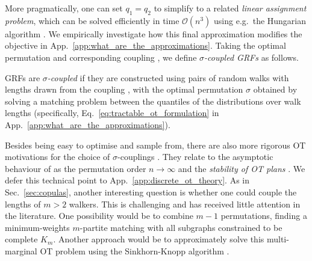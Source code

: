 More pragmatically, one can set $q_1 = q_2$ to simplify to a related \emph{linear assignment problem}, which can be solved efficiently in time $\mathcal{O}(n^3)$ using e.g.~the Hungarian algorithm \citep{kuhn1955hungarian}.
We empirically investigate how this final approximation modifies the objective in App.~\ref{app:what_are_the_approximations}.
Taking the optimal permutation and corresponding coupling \smash{$\mu^{(\sigma)}$}, we define \emph{$\sigma$-coupled GRFs} as follows.


\color{black}

\begin{tcolorbox}[colback=gray!10!white,colframe=gray!50!black,arc=0mm,boxrule=0.5pt]
\begin{definition} \label{def:coupled_grfs_def}
GRFs are \emph{$\sigma$-coupled} if they are constructed using pairs of random walks with lengths drawn from the coupling \smash{$\mu^{(\sigma)}$}, with the optimal permutation $\sigma$ obtained by solving a matching problem between the quantiles of the distributions over walk lengths (specifically, Eq.~\ref{eq:tractable_ot_formulation} in App.~\ref{app:what_are_the_approximations}).
\end{definition}
\end{tcolorbox}

Besides being easy to optimise and sample from, there are also more rigorous OT motivations for the choice of $\sigma$-couplings \smash{$\mu^{(\sigma)}$}.
They relate to the asymptotic behaviour of \smash{$\mu^{(\sigma)}$} as the permutation order $n \to \infty$ and the \emph{stability of OT plans} \citep{villani2021topics}. 
We defer this technical point to App.~\ref{app:discrete_ot_theory}. 
As in Sec.~\ref{sec:copulas}, another interesting question is whether one could couple the lengths of $m>2$ walkers.
This is challenging and has received little attention in the literature. 
One possibility would be to combine $m-1$ permutations, finding a minimum-weights $m$-partite matching with all subgraphs constrained to be complete $K_m$.
Another approach would be to approximately solve this multi-marginal OT problem using the Sinkhorn-Knopp algorithm \citep{sinkhorn1967concerning, cuturi2013sinkhorn}.

